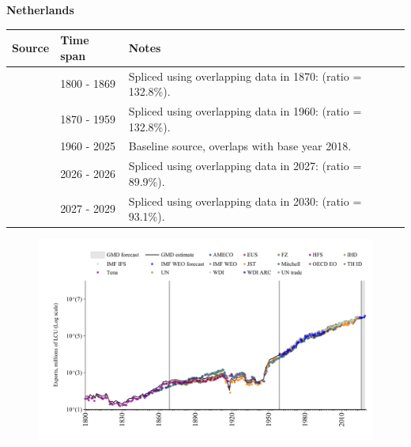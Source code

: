 \documentclass[12pt,a4paper,landscape]{article}
\begin{document}
\begin{adjustbox}{max totalsize={\paperwidth}{\paperheight},center}
\begin{minipage}[t][\textheight][t]{\textwidth}
\vspace*{0.5cm}
{}
\begin{center}
{\Large\bfseries Netherlands}
\end{center}
\vspace{0.5cm}
\begin{table}[H]
\centering
\small
\begin{tabular}{|l|l|l|}
\hline
\textbf{Source} & \textbf{Time span} & \textbf{Notes} \\
\hline
\rowcolor{white}\cite{Tena}& 1800 - 1869 &Spliced using overlapping data in 1870: (ratio = 132.8\%).\\
\rowcolor{lightgray}\cite{JST}& 1870 - 1959 &Spliced using overlapping data in 1960: (ratio = 132.8\%).\\
\rowcolor{white}\cite{OECD_EO}& 1960 - 2025 &Baseline source, overlaps with base year 2018.\\
\rowcolor{lightgray}\cite{AMECO}& 2026 - 2026 &Spliced using overlapping data in 2027: (ratio = 89.9\%).\\
\rowcolor{white}\cite{IMF_WEO_forecast}& 2027 - 2029 &Spliced using overlapping data in 2030: (ratio = 93.1\%).\\
\hline
\end{tabular}
\end{table}
\begin{figure}[H]
\centering
\includegraphics[width=\textwidth,height=0.6\textheight,keepaspectratio]{graphs/NLD_exports.pdf}
\end{figure}
\end{minipage}
\end{adjustbox}
\end{document}
